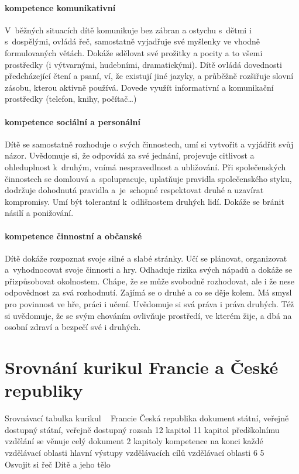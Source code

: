 				\paragraph{kompetence komunikativní}
					V běžných situacích dítě komunikuje bez zábran a ostychu s dětmi i s dospělými, ovládá řeč, samostatně vyjadřuje své myšlenky ve vhodně formulovaných větách. Dokáže sdělovat své prožitky a pocity a to všemi prostředky (i výtvarnými, hudebními, dramatickými). Dítě ovládá dovednosti předcházející čtení a psaní, ví, že existují jiné jazyky, a průběžně rozšiřuje slovní zásobu, kterou aktivně používá. Dovede využít informativní a komunikační prostředky (telefon, knihy, počítač…)

				\paragraph{kompetence sociální a personální}
					Dítě se samostatně rozhoduje o svých činnostech, umí si vytvořit a vyjádřit svůj názor. Uvědomuje si, že odpovídá za své jednání, projevuje citlivost a ohleduplnost k druhým, vnímá nespravedlnost a ubližování. Při společenských činnostech se domlouvá a spolupracuje, uplatňuje pravidla společenského styku, dodržuje dohodnutá pravidla a je schopné respektovat druhé a uzavírat kompromisy. Umí být tolerantní k odlišnostem druhých lidí. Dokáže se bránit násilí a ponižování.

				\paragraph{kompetence činnostní a občanské}
					Dítě dokáže rozpoznat svoje silné a slabé stránky. Učí se plánovat, organizovat a vyhodnocovat svoje činnosti a hry. Odhaduje rizika svých nápadů a dokáže se přizpůsobovat okolnostem. Chápe, že se může svobodně rozhodovat, ale i že nese odpovědnost za svá rozhodnutí. Zajímá se o druhé a co se děje kolem. Má smysl pro povinnost ve hře, práci i učení. Uvědomuje si svá práva i práva druhých. Též si uvědomuje, že se svým chováním ovlivňuje prostředí, ve kterém žije, a dbá na osobní zdraví a bezpečí své i druhých. 



\section{Srovnání kurikul Francie a České republiky}
Srovnávací tabulka kurikul
 
Francie
Česká republika
dokument
státní, veřejně dostupný
státní, veřejně dostupný
rozsah
12 kapitol
11 kapitol
předškolnímu vzdělání se věnuje
celý dokument
2 kapitoly
kompetence
na konci každé vzdělávací oblasti
hlavní výstupy vzdělávacích cílů
vzdělávací oblasti
6
5
 
Osvojit si řeč
Dítě a jeho tělo

